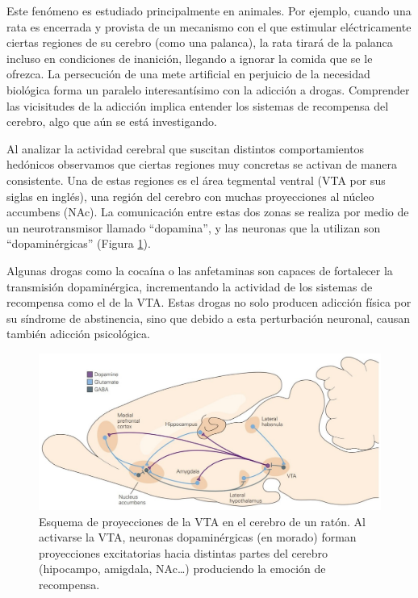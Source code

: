 Este fenómeno es estudiado principalmente en animales. Por ejemplo, cuando una rata es encerrada y provista de un mecanismo con el que estimular eléctricamente ciertas regiones de su cerebro (como una palanca), la rata tirará de la palanca incluso en condiciones de inanición, llegando a ignorar la comida que se le ofrezca. La persecución de una mete artificial en perjuicio de la necesidad biológica forma un paralelo interesantísimo con la adicción a drogas. Comprender las vicisitudes de la adicción implica entender los sistemas de recompensa del cerebro, algo que aún se está investigando.

Al analizar la actividad cerebral que suscitan distintos comportamientos hedónicos observamos que ciertas regiones muy concretas se activan de manera consistente. Una de estas regiones es el área tegmental ventral (VTA por sus siglas en inglés), una región del cerebro con muchas proyecciones al núcleo accumbens (NAc). La comunicación entre estas dos zonas se realiza por medio de un neurotransmisor llamado \enquote{dopamina}, y las neuronas que la utilizan son \enquote{dopaminérgicas} (Figura \ref{ratbrain}).

Algunas drogas como la cocaína o las anfetaminas son capaces de fortalecer la transmisión dopaminérgica, incrementando la actividad de los sistemas de recompensa como el de la VTA. Estas drogas no solo producen adicción física por su síndrome de abstinencia, sino que debido a esta perturbación neuronal, causan también adicción psicológica.

\begin{figure}[H]
	\centering
	\includegraphics[width=\linewidth]{media/8-ratbrain.png}
	\caption{Esquema de proyecciones de la VTA en el cerebro de un ratón. Al activarse la VTA, neuronas dopaminérgicas (en morado) forman proyecciones excitatorias hacia distintas partes del cerebro (hipocampo, amigdala, NAc…) produciendo la emoción de recompensa.}
	\label{ratbrain}
\end{figure}

